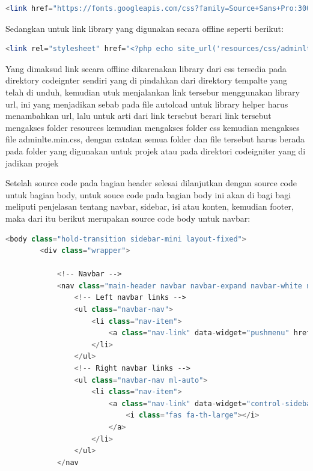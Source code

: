 \begin{lstlisting}[language=PHP]
<link href="https://fonts.googleapis.com/css?family=Source+Sans+Pro:300,400,400i,700" rel="stylesheet">
\end{lstlisting}

\pagebreak
Sedangkan untuk link library yang digunakan secara offline seperti berikut:
\begin{lstlisting}[language=PHP]
<link rel="stylesheet" href="<?php echo site_url('resources/css/adminlte.min.css'); ?>">
\end{lstlisting}

Yang dimaksud link secara offline dikarenakan library dari css tersedia pada direktory codeignter sendiri yang di pindahkan dari direktory tempalte yang telah di unduh, kemudian utuk menjalankan link tersebur menggunakan library url, ini yang menjadikan sebab pada file autoload untuk library helper harus menambahkan url, lalu untuk arti dari link tersebut berari link tersebut mengakses folder resources kemudian mengakses folder css kemudian mengakses file adminlte.min.css, dengan catatan semua folder dan file tersebut harus berada pada folder yang digunakan untuk projek atau pada direktori codeigniter yang di jadikan projek\par
	Setelah source code pada bagian header selesai dilanjutkan dengan source code untuk bagian body, untuk souce code pada bagian body ini akan di bagi bagi meliputi penjelasan tentang navbar, sidebar, isi atau konten, kemudian footer, maka dari itu berikut merupakan source code body untuk navbar:\par


\begin{lstlisting}[language=PHP]
	<body class="hold-transition sidebar-mini layout-fixed">  
	    <div class="wrapper">  
	  
	        <!-- Navbar -->  
	        <nav class="main-header navbar navbar-expand navbar-white navbar-light">  
	            <!-- Left navbar links -->  
	            <ul class="navbar-nav">  
	                <li class="nav-item">  
	                    <a class="nav-link" data-widget="pushmenu" href="#"><i class="fas fa-bars"></i></a>  
	                </li>  
	            </ul>  
	            <!-- Right navbar links -->  
	            <ul class="navbar-nav ml-auto">  
	                <li class="nav-item">  
	                    <a class="nav-link" data-widget="control-sidebar" data-slide="true" href="#">  
	                        <i class="fas fa-th-large"></i>  
	                    </a>  
	                </li>  
	            </ul>  
	        </nav
\end{lstlisting}

